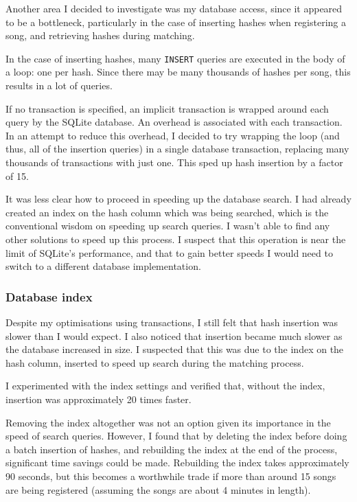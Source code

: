 \documentclass[12pt,a4paper,twoside,openright]{report}
\begin{document}
Another area I decided to investigate was my database access, since it appeared to be a bottleneck, particularly in the case of inserting hashes when registering a song, and retrieving hashes during matching.

In the case of inserting hashes, many \lstinline{INSERT} queries are executed in the body of a loop: one per hash. Since there may be many thousands of hashes per song, this results in a lot of queries.

If no transaction is specified, an implicit transaction is wrapped around each query by the SQLite database. An overhead is associated with each transaction. In an attempt to reduce this overhead, I decided to try wrapping the loop (and thus, all of the insertion queries) in a single database transaction, replacing many thousands of transactions with just one. This sped up hash insertion by a factor of 15.

It was less clear how to proceed in speeding up the database search. I had already created an index on the hash column which was being searched, which is the conventional wisdom on speeding up search queries. I wasn't able to find any other solutions to speed up this process. I suspect that this operation is near the limit of SQLite's performance, and that to gain better speeds I would need to switch to a different database implementation.

\subsubsection{Database index}

Despite my optimisations using transactions, I still felt that hash insertion was slower than I would expect. I also noticed that insertion became much slower as the database increased in size. I suspected that this was due to the index on the hash column, inserted to speed up search during the matching process.

I experimented with the index settings and verified that, without the index, insertion was approximately 20 times faster.

Removing the index altogether was not an option given its importance in the speed of search queries. However, I found that by deleting the index before doing a batch insertion of hashes, and rebuilding the index at the end of the process, significant time savings could be made. Rebuilding the index takes approximately 90 seconds, but this becomes a worthwhile trade if more than around 15 songs are being registered (assuming the songs are about 4 minutes in length).
\end{document}

